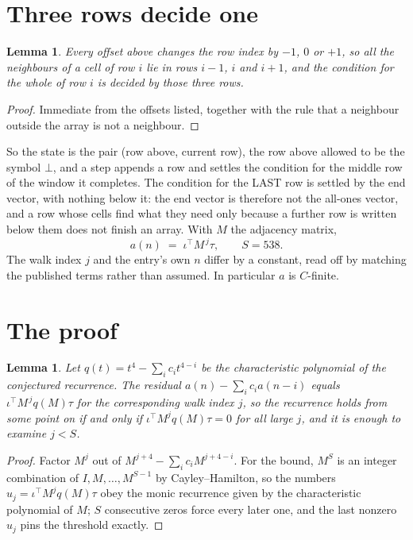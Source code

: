 \documentclass[11pt,a4paper]{article}
\theoremstyle{plain}
\newtheorem{lemma}[theorem]{Lemma}
\theoremstyle{definition}
\begin{document}
\section{Three rows decide one}

\begin{lemma}\label{lem:win}
Every offset above changes the row index by $-1$, $0$ or $+1$, so all the neighbours of a cell
of row $i$ lie in rows $i-1$, $i$ and $i+1$, and the condition for the whole of row $i$ is
decided by those three rows.
\end{lemma}

\begin{proof}
Immediate from the offsets listed, together with the rule that a neighbour outside the array is
not a neighbour.
\end{proof}

So the state is the pair (row above, current row), the row above allowed to be the symbol
$\bot$, and a step appends a row and settles the condition for the middle row of the window it
completes. The condition for the LAST row is settled by the end vector, with nothing below it:
the end vector is therefore not the all-ones vector, and a row whose cells find what they need
only because a further row is written below them does not finish an array. With $M$ the
adjacency matrix,
\[
a(n)\;=\;\iota^{\!\top}M^{\,j}\tau ,\qquad S=538.
\]
The walk index $j$ and the entry's own $n$ differ by a constant, read off by matching the
published terms rather than assumed. In particular $a$ is $C$-finite.

\section{The proof}

\begin{lemma}\label{lem:crit}
Let $q(t)=t^{4}-\sum_i c_it^{4-i}$ be the characteristic polynomial of the
conjectured recurrence. The residual $a(n)-\sum_ic_ia(n-i)$ equals
$\iota^{\!\top}M^{\,j}q(M)\tau$ for the corresponding walk index $j$, so the recurrence
holds from some point on if and only if $\iota^{\!\top}M^{j}q(M)\tau=0$ for all large $j$,
and it is enough to examine $j<S$.
\end{lemma}

\begin{proof}
Factor $M^{j}$ out of $M^{j+4}-\sum_ic_iM^{j+4-i}$. For the bound, $M^{S}$
is an integer combination of $I,M,\dots,M^{S-1}$ by Cayley--Hamilton, so the numbers
$u_j=\iota^{\!\top}M^{j}q(M)\tau$ obey the monic recurrence given by the characteristic
polynomial of $M$; $S$ consecutive zeros force every later one, and the last nonzero $u_j$
pins the threshold exactly.
\end{proof}
\end{document}
